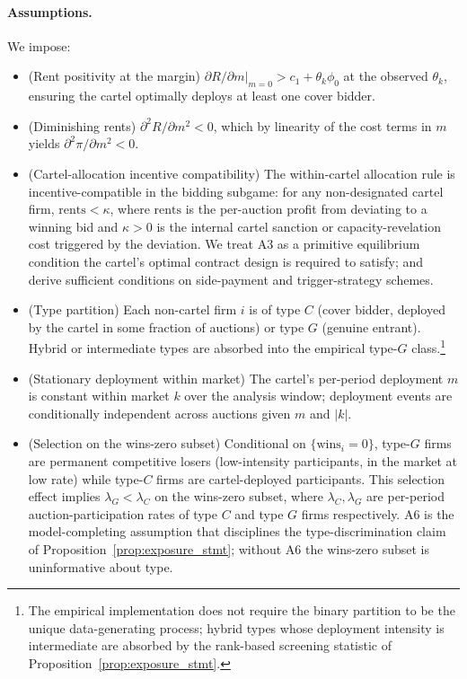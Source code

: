 \paragraph{Assumptions.} We impose:
\begin{itemize}
\item[\textbf{A1}] (Rent positivity at the margin)
$\partial R / \partial m |_{m=0} > c_1 + \theta_k \phi_0$ at
the observed $\theta_k$, ensuring the cartel optimally deploys
at least one cover bidder.
\item[\textbf{A2}] (Diminishing rents)
$\partial^2 R / \partial m^2 < 0$, which by linearity of the
cost terms in $m$ yields $\partial^2 \pi / \partial m^2 < 0$.
\item[\textbf{A3}] (Cartel-allocation incentive compatibility)
The within-cartel allocation rule is incentive-compatible in
the bidding subgame: for any non-designated cartel firm,
$\mathrm{rents} < \kappa$, where $\mathrm{rents}$ is the per-auction
profit from deviating to a winning bid and $\kappa > 0$ is the
internal cartel sanction or capacity-revelation cost triggered
by the deviation. We treat A3 as a primitive equilibrium
condition the cartel's optimal contract design is required to
satisfy; \citet{marshall2012economics} and
\citet{asker2010leniency} derive sufficient conditions on
side-payment and trigger-strategy schemes.
\item[\textbf{A4}] (Type partition) Each non-cartel firm $i$ is
of type $C$ (cover bidder, deployed by the cartel in some
fraction of auctions) or type $G$ (genuine entrant). Hybrid or
intermediate types are absorbed into the empirical type-$G$
class.\footnote{The empirical implementation does not require
the binary partition to be the unique data-generating process;
hybrid types whose deployment intensity is intermediate are
absorbed by the rank-based screening statistic of
Proposition~\ref{prop:exposure_stmt}.}
\item[\textbf{A5}] (Stationary deployment within market) The
cartel's per-period deployment $m$ is constant within market
$k$ over the analysis window; deployment events are conditionally
independent across auctions given $m$ and $|k|$.
\item[\textbf{A6}] (Selection on the wins-zero subset)
Conditional on $\{\text{wins}_i = 0\}$, type-$G$ firms are
permanent competitive losers (low-intensity participants, in
the market at low rate) while type-$C$ firms are cartel-deployed
participants. This selection effect implies $\lambda_G <
\lambda_C$ on the wins-zero subset, where $\lambda_C, \lambda_G$
are per-period auction-participation rates of type $C$ and
type $G$ firms respectively. A6 is the model-completing
assumption that disciplines the type-discrimination claim of
Proposition~\ref{prop:exposure_stmt}; without A6 the wins-zero
subset is uninformative about type.
\end{itemize}

